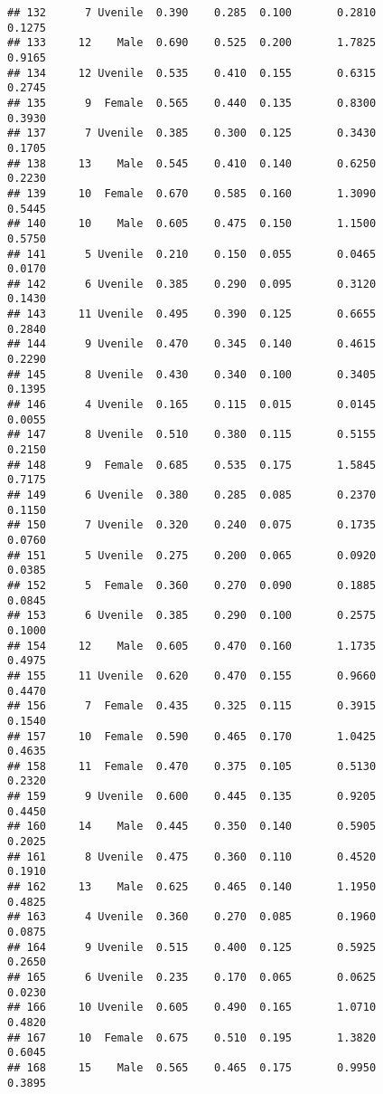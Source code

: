 \documentclass[
]{article}
\begin{document}
\begin{verbatim}
## 132      7 Uvenile  0.390    0.285  0.100       0.2810         0.1275
## 133     12    Male  0.690    0.525  0.200       1.7825         0.9165
## 134     12 Uvenile  0.535    0.410  0.155       0.6315         0.2745
## 135      9  Female  0.565    0.440  0.135       0.8300         0.3930
## 137      7 Uvenile  0.385    0.300  0.125       0.3430         0.1705
## 138     13    Male  0.545    0.410  0.140       0.6250         0.2230
## 139     10  Female  0.670    0.585  0.160       1.3090         0.5445
## 140     10    Male  0.605    0.475  0.150       1.1500         0.5750
## 141      5 Uvenile  0.210    0.150  0.055       0.0465         0.0170
## 142      6 Uvenile  0.385    0.290  0.095       0.3120         0.1430
## 143     11 Uvenile  0.495    0.390  0.125       0.6655         0.2840
## 144      9 Uvenile  0.470    0.345  0.140       0.4615         0.2290
## 145      8 Uvenile  0.430    0.340  0.100       0.3405         0.1395
## 146      4 Uvenile  0.165    0.115  0.015       0.0145         0.0055
## 147      8 Uvenile  0.510    0.380  0.115       0.5155         0.2150
## 148      9  Female  0.685    0.535  0.175       1.5845         0.7175
## 149      6 Uvenile  0.380    0.285  0.085       0.2370         0.1150
## 150      7 Uvenile  0.320    0.240  0.075       0.1735         0.0760
## 151      5 Uvenile  0.275    0.200  0.065       0.0920         0.0385
## 152      5  Female  0.360    0.270  0.090       0.1885         0.0845
## 153      6 Uvenile  0.385    0.290  0.100       0.2575         0.1000
## 154     12    Male  0.605    0.470  0.160       1.1735         0.4975
## 155     11 Uvenile  0.620    0.470  0.155       0.9660         0.4470
## 156      7  Female  0.435    0.325  0.115       0.3915         0.1540
## 157     10  Female  0.590    0.465  0.170       1.0425         0.4635
## 158     11  Female  0.470    0.375  0.105       0.5130         0.2320
## 159      9 Uvenile  0.600    0.445  0.135       0.9205         0.4450
## 160     14    Male  0.445    0.350  0.140       0.5905         0.2025
## 161      8 Uvenile  0.475    0.360  0.110       0.4520         0.1910
## 162     13    Male  0.625    0.465  0.140       1.1950         0.4825
## 163      4 Uvenile  0.360    0.270  0.085       0.1960         0.0875
## 164      9 Uvenile  0.515    0.400  0.125       0.5925         0.2650
## 165      6 Uvenile  0.235    0.170  0.065       0.0625         0.0230
## 166     10 Uvenile  0.605    0.490  0.165       1.0710         0.4820
## 167     10  Female  0.675    0.510  0.195       1.3820         0.6045
## 168     15    Male  0.565    0.465  0.175       0.9950         0.3895

\end{verbatim}
\end{document}
